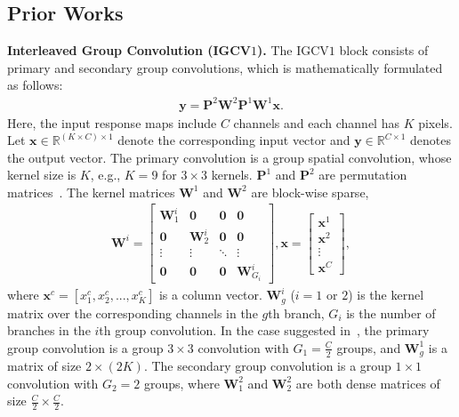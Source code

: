 \documentclass{bmvc2k}
\begin{document}
	\subsection{Prior Works}
	\textbf{Interleaved Group Convolution (IGCV$1$).}
	The IGCV$1$ block
	consists of primary and secondary group convolutions,
	which is mathematically formulated as follows:
	\begin{align}
	\mathbf{y} = \mathbf{P}^2\mathbf{W}^2 \mathbf{P}^1\mathbf{W}^1 \mathbf{x}.
	\label{eqn:IGC}
	\end{align}
	Here, the input response maps include $C$ channels and each channel has $K$ pixels. Let $\mathbf{x} \in \mathbb{R}^{(K\times C)\times 1}$ denote the corresponding input vector and $\mathbf{y} \in \mathbb{R}^{C\times1}$ denotes the output vector. The primary convolution is a group spatial convolution, whose kernel size is $K$, e.g., $K=9$ for $3\times 3$ kernels. $\mathbf{P}^1$ and $\mathbf{P}^2$ are permutation matrices~\cite{zhang2017interleaved}.
	The kernel matrices $\mathbf{W}^1$ and $\mathbf{W}^2$ are block-wise sparse,
	\begin{align}
	\mathbf{W}^i =  \begin{bmatrix}
	\mathbf{W}_{1}^i & \boldsymbol{0} &  \boldsymbol{0} &  \boldsymbol{0} \\[0.3em]
	\boldsymbol{0} & \mathbf{W}_{2}^i  & \boldsymbol{0} & \boldsymbol{0} \\[0.3em]
	\vdots & \vdots & \ddots  & \vdots \\[0.3em]
	\boldsymbol{0} & \boldsymbol{0} & \boldsymbol{0} & \mathbf{W}_{G_i}^i
	\end{bmatrix},
	\mathbf{x} =  \begin{bmatrix}
	\mathbf{x}^{1}\\[0.3em]
	\mathbf{x}^{2}  \\[0.3em]
	\vdots \\[0.3em]
	\mathbf{x}^{C}
	\end{bmatrix},
	\label{eqn:groupconvolution}
	\end{align}
	where $\mathbf{x}^{c}=[x_1^c,x_2^c,...,x_{K}^c]$ is a column vector. $\mathbf{W}_{g}^i$ ($i=1$ or $2$) is
	the kernel matrix
	over the corresponding channels
	in the $g$th branch,
	$G_i$ is the number of branches
	in the $i$th group convolution.
	In the case suggested in~\cite{zhang2017interleaved},
	the primary group convolution is a
	group $3\times 3$
	convolution with $G_1 = \frac{C}{2}$ groups,
	and $\mathbf{W}^1_g$ is a matrix of size $2 \times (2K)$.
	The secondary group convolution is a group $1\times 1$ convolution with $G_2 = 2$ groups,
	where $\mathbf{W}^2_1$ and $\mathbf{W}^2_2$
	are both dense matrices of size $\frac{C}{2} \times \frac{C}{2}$.
\end{document}
